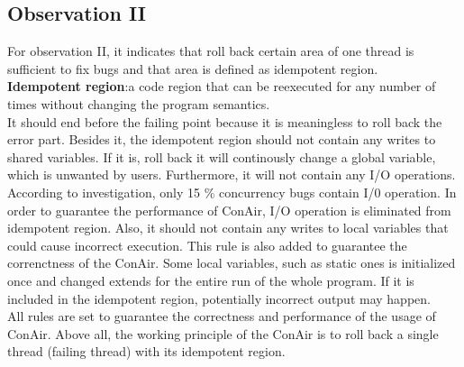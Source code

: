 \subsection{Observation II}
\label{sbii}
For observation II, it indicates that roll back certain area of one thread is sufficient to fix bugs and that area is defined as idempotent region.\\
\textbf{Idempotent region}:a code region that can be reexecuted for any number of times without changing the program semantics.\\
It should end before the failing point because it is meaningless to roll back the error part. Besides it, the idempotent region should not contain any writes to shared variables. If it is, roll back it will continously change a global variable, which is unwanted by users. Furthermore, it will not contain any I/O operations. According to investigation, only 15 \% concurrency bugs contain I/0 operation. In order to guarantee the performance of ConAir, I/O operation is eliminated from idempotent region. Also, it should not contain any writes to local variables that could cause incorrect execution. This rule is also added to guarantee the correnctness of the ConAir. Some local variables, such as static ones is initialized once and changed extends for the entire run of the whole program. If it is included in the idempotent region, potentially incorrect output may happen.\\
All rules are set to guarantee the correctness and performance of the usage of ConAir. Above all, the working principle of the ConAir is to roll back a single thread (failing thread) with its idempotent region.

 
